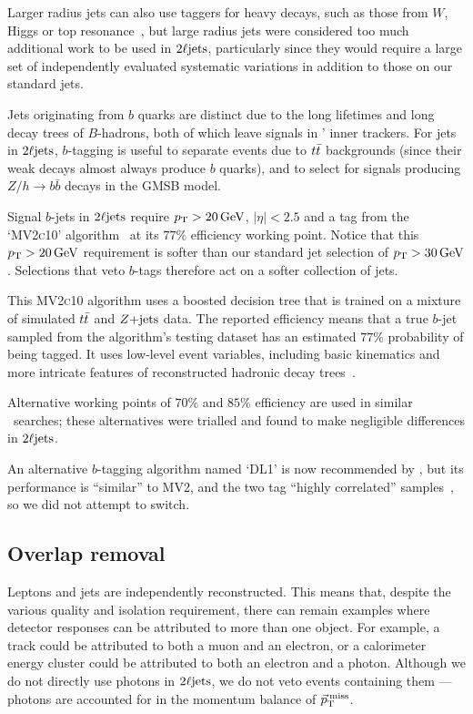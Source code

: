 Larger radius jets can also use taggers for heavy decays, such as those from
$W$, Higgs or top resonance~\cite{JETM-2018-06}, but large radius jets were
considered too much additional work to be used in $\twoljets$,
particularly since they would require a large set of independently evaluated
systematic variations in addition to those on our standard jets.

Jets originating from $b$ quarks are distinct due to the long lifetimes and
long decay trees of $B$-hadrons, both of which leave signals in \atlas'
inner trackers.
For jets in $\twoljets$, $b$-tagging is useful to separate events due to
$\ttbar$ backgrounds (since their weak decays almost always produce $b$
quarks), and to select for signals producing $Z/h \to b\bar b$ decays
in the GMSB model.

Signal $b$-jets in $\twoljets$ require $\pt > 20\,\eV[G]$, $|\eta| < 2.5$ and a
tag from the `\textsc{MV2c10}' algorithm~\cite{
friedman2002stochastic,
atlas_jet_mv2c10_2017,
atlas_jet_tagging_2019
} at its $77\%$ efficiency working point.
Notice that this $\pt > 20\,\eV[G]$ requirement is softer than our standard jet
selection of $\pt > 30\,\eV[G]$. Selections that veto $b$-tags therefore act on
a softer collection of jets.

This \textsc{MV2c10} algorithm uses a boosted decision tree that is trained on
a mixture of simulated $\ttbar$ and $\zjets$ data.
The reported efficiency means that a true $b$-jet sampled from the
algorithm's testing dataset has an estimated $77\%$ probability of being
tagged.
It uses low-level event variables, including basic kinematics and more intricate
features of reconstructed hadronic decay
trees~\cite{atlas_jet_mv2c10_2017, atlas_twiki_mv2}.

Alternative working points of $70\%$ and $85\%$ efficiency are used in similar
\atlas\ searches;
these alternatives were trialled and found to make negligible differences in
$\twoljets$.

An alternative $b$-tagging algorithm named `DL1' is now recommended by \atlas,
but its performance is ``similar'' to MV2, and the two tag
``highly correlated'' samples~\cite{atlas_jet_tagging_2019}, so we did not
attempt to switch.


\subsection{Overlap removal}
\label{sec:2ljets_overlap_removal}
Leptons and jets are independently reconstructed.
This means that, despite the various quality and isolation requirement, there
can remain examples where detector responses can be attributed to more than
one object.
For example, a track could be attributed to both a muon and an electron,
or a calorimeter energy cluster could be attributed to both an electron and a
photon. Although we do not directly use photons in $\twoljets$, we do not veto
events containing them --- photons are accounted for in the momentum balance
of $\ptmiss$.

